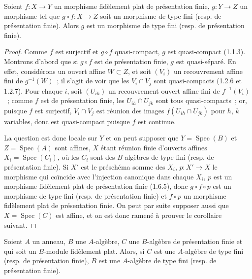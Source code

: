 \begin{proposition}[11.3.16]
\label{IV.11.3.16-fr}
Soient $f:X\to Y$ un morphisme fidèlement plat de présentation finie,
$g:Y\to Z$ un morphisme tel que $g\circ f:X\to Z$ soit un morphisme de type
fini (resp. de présentation finie). Alors $g$ est un morphisme de type fini
(resp. de présentation finie).
\end{proposition}

\begin{proof}
Comme $f$ est surjectif et $g\circ f$ quasi-compact, $g$ est quasi-compact
(1.1.3). Montrons d'abord que si $g\circ f$ est de présentation finie, $g$ est
quasi-séparé. En effet, considérons un ouvert affine $W\subset Z$, et soit
$(V_i)$ un recouvrement affine fini de $g^{-1}(W)$~; il s'agit de voir que les
$V_i\cap V_j$ sont quasi-compacts (1.2.6 et 1.2.7). Pour chaque $i$, soit
$(U_{ih})$ un recouvrement ouvert affine fini de $f^{-1}(V_i)$~; comme $f$ est
de présentation finie, les $U_{ih}\cap U_{jk}$ sont tous quasi-compacts~; or,
puisque $f$ est surjectif, $V_i\cap V_j$ est réunion des images
$f(U_{ih}\cap U_{jk})$ pour $h$, $k$ variables, donc est quasi-compact puisque
$f$ est continue.

La question est donc locale sur $Y$ et on peut supposer que
$Y=\operatorname{Spec}(B)$ et $Z=\operatorname{Spec}(A)$ sont affines, $X$
étant réunion finie d'ouverts affines $X_i=\operatorname{Spec}(C_i)$, où les
$C_i$ sont des $B$-algèbres de type fini (resp. de présentation finie). Si
$X'$ est le préschéma somme des $X_i$, $p:X'\to X$ le morphisme qui coïncide
avec l'injection canonique dans chaque $X_i$, $p$ est un morphisme fidèlement
plat de présentation finie (1.6.5), donc $g\circ f\circ p$ est un morphisme de
type fini (resp. de présentation finie) et $f\circ p$ un morphisme fidèlement
plat de présentation finie. On peut par suite supposer aussi que
$X=\operatorname{Spec}(C)$ est affine, et on est donc ramené à prouver le
corollaire suivant.
\end{proof}

\begin{corollary}[11.3.17]
\label{IV.11.3.17-fr}
Soient $A$ un anneau, $B$ une $A$-algèbre, $C$ une $B$-algèbre de présentation
finie et qui soit un $B$-module fidèlement plat. Alors, si $C$ est une
$A$-algèbre de type fini (resp. de présentation finie), $B$ est une
$A$-algèbre de type fini (resp. de présentation finie).
\end{corollary}

